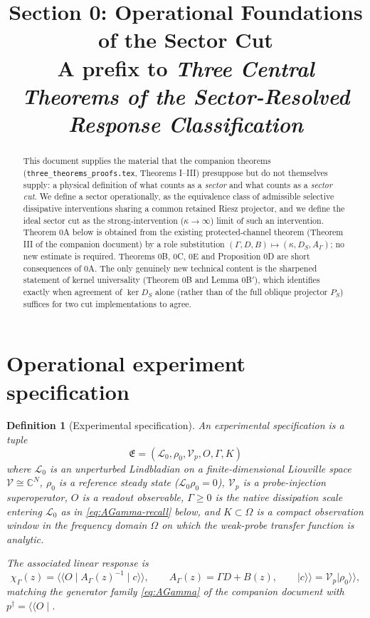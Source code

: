 \documentclass[11pt]{article}
\title{Section 0: Operational Foundations of the Sector Cut\\
\large A prefix to \emph{Three Central Theorems of the
Sector-Resolved Response Classification}}
\author{}
\date{}
\newtheorem{definition}[theorem]{Definition}
\newcommand{\E}{\mathfrak E}
\begin{document}
\maketitle

\begin{abstract}
This document supplies the material that the companion theorems
(\texttt{three\_theorems\_proofs.tex}, Theorems I--III) presuppose but do
not themselves supply: a physical definition of what counts as a
\emph{sector} and what counts as a \emph{sector cut}. We define a sector
operationally, as the equivalence class of admissible selective
dissipative interventions sharing a common retained Riesz projector, and
we define the ideal sector cut as the strong-intervention
($\kappa\to\infty$) limit of such an intervention. Theorem 0A below is
obtained from the existing protected-channel theorem (Theorem III of the
companion document) by a role substitution
$(\Gamma,D,B)\mapsto(\kappa,D_S,A_\Gamma)$; no new estimate is required.
Theorems 0B, 0C, 0E and Proposition 0D are short consequences of 0A. The
only genuinely new technical content is the sharpened statement of kernel
universality (Theorem 0B and Lemma 0B$'$), which identifies exactly when
agreement of $\ker D_S$ alone (rather than of the full oblique projector
$P_S$) suffices for two cut implementations to agree.
\end{abstract}

\section{Operational experiment specification}

\begin{definition}[Experimental specification]
\label{def:E}
An \emph{experimental specification} is a tuple
\[
\E=(\mathcal L_0,\rho_0,\mathcal V_p,O,\Gamma,K)
\]
where $\mathcal L_0$ is an unperturbed Lindbladian on a finite-dimensional
Liouville space $\mathcal V\cong\mathbb C^N$, $\rho_0$ is a reference
steady state ($\mathcal L_0\rho_0=0$), $\mathcal V_p$ is a probe-injection
superoperator, $O$ is a readout observable, $\Gamma\ge0$ is the native
dissipation scale entering $\mathcal L_0$ as in
\eqref{eq:AGamma-recall} below, and $K\subset\Omega$ is a compact
observation window in the frequency domain $\Omega$ on which the weak-probe
transfer function is analytic.

The associated linear response is
\[
\chi_\Gamma(z)=\langle\!\langle O\mid A_\Gamma(z)^{-1}\mid c\rangle\!\rangle,
\qquad
A_\Gamma(z)=\Gamma D+B(z),
\qquad
\lvert c\rangle\!\rangle=\mathcal V_p\lvert\rho_0\rangle\!\rangle,
\label{eq:AGamma-recall}
\tag{0.1}
\]
matching the generator family \eqref{eq:AGamma} of the companion document
with $p^\dagger=\langle\!\langle O\mid$.
\end{definition}
\end{document}

